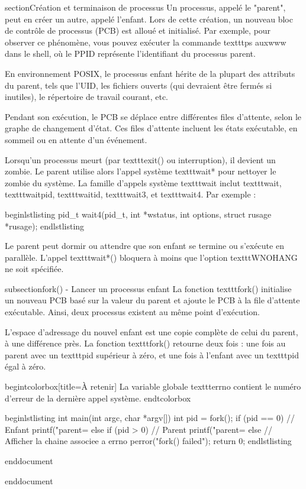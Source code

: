 section{Création et terminaison de processus}
Un processus, appelé le "parent", peut en créer un autre, appelé l'enfant. Lors de cette création, un nouveau bloc de contrôle de processus (PCB) est alloué et initialisé. Par exemple, pour observer ce phénomène, vous pouvez exécuter la commande texttt{ps auxwww} dans le shell, où le PPID représente l'identifiant du processus parent.

En environnement POSIX, le processus enfant hérite de la plupart des attributs du parent, tels que l'UID, les fichiers ouverts (qui devraient être fermés si inutiles), le répertoire de travail courant, etc.

Pendant son exécution, le PCB se déplace entre différentes files d'attente, selon le graphe de changement d'état. Ces files d'attente incluent les états exécutable, en sommeil ou en attente d'un événement.

Lorsqu'un processus meurt (par texttt{exit()} ou interruption), il devient un zombie. Le parent utilise alors l'appel système texttt{wait*} pour nettoyer le zombie du système. La famille d'appels système texttt{wait} inclut texttt{wait}, texttt{waitpid}, texttt{waitid}, texttt{wait3}, et texttt{wait4}. Par exemple :

begin{lstlisting}
pid_t wait4(pid_t, int *wstatus, int options, struct rusage *rusage);
end{lstlisting}

Le parent peut dormir ou attendre que son enfant se termine ou s'exécute en parallèle. L'appel texttt{wait*()} bloquera à moins que l'option texttt{WNOHANG} ne soit spécifiée.

subsection{fork() - Lancer un processus enfant}
La fonction texttt{fork()} initialise un nouveau PCB basé sur la valeur du parent et ajoute le PCB à la file d'attente exécutable. Ainsi, deux processus existent au même point d'exécution.

L'espace d'adressage du nouvel enfant est une copie complète de celui du parent, à une différence près. La fonction texttt{fork()} retourne deux fois : une fois au parent avec un texttt{pid} supérieur à zéro, et une fois à l'enfant avec un texttt{pid} égal à zéro.

begin{tcolorbox}[title={À retenir}]
La variable globale texttt{errno} contient le numéro d'erreur de la dernière appel système.
end{tcolorbox}

begin{lstlisting}
int main(int argc, char *argv[])
{
    int pid = fork();
    if (pid == 0) {
        // Enfant
        printf("parent=%
    }
    else if (pid > 0) {
        // Parent
        printf("parent=%
    }
    else {
        // Afficher la chaine associee a errno
        perror("fork() failed");
    }
    return 0;
}
end{lstlisting}

end{document}

end{document}
